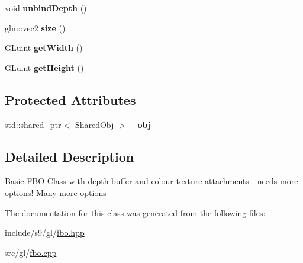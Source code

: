 \begin{DoxyCompactItemize}
\item 
\hypertarget{classs9_1_1gl_1_1FBO_af8f11487eabd27072d1a2189537deb96}{void {\bfseries unbind\-Depth} ()}\label{classs9_1_1gl_1_1FBO_af8f11487eabd27072d1a2189537deb96}

\item 
\hypertarget{classs9_1_1gl_1_1FBO_a7e167bec508bd08b77c0fd1086b887af}{glm\-::vec2 {\bfseries size} ()}\label{classs9_1_1gl_1_1FBO_a7e167bec508bd08b77c0fd1086b887af}

\item 
\hypertarget{classs9_1_1gl_1_1FBO_a871216289af220e56d59b49ac788b588}{G\-Luint {\bfseries get\-Width} ()}\label{classs9_1_1gl_1_1FBO_a871216289af220e56d59b49ac788b588}

\item 
\hypertarget{classs9_1_1gl_1_1FBO_aa17e9cf870cf5eb0b2fb780482d1c0da}{G\-Luint {\bfseries get\-Height} ()}\label{classs9_1_1gl_1_1FBO_aa17e9cf870cf5eb0b2fb780482d1c0da}

\end{DoxyCompactItemize}
\subsection*{Protected Attributes}
\begin{DoxyCompactItemize}
\item 
\hypertarget{classs9_1_1gl_1_1FBO_a467391f5bd87d1dfaa68aff17c9647c9}{std\-::shared\-\_\-ptr$<$ \hyperlink{structs9_1_1gl_1_1FBO_1_1SharedObj}{Shared\-Obj} $>$ {\bfseries \-\_\-obj}}\label{classs9_1_1gl_1_1FBO_a467391f5bd87d1dfaa68aff17c9647c9}

\end{DoxyCompactItemize}


\subsection{Detailed Description}
Basic \hyperlink{classs9_1_1gl_1_1FBO}{F\-B\-O} Class with depth buffer and colour texture attachments  -\/ needs more options! Many more options 

The documentation for this class was generated from the following files\-:\begin{DoxyCompactItemize}
\item 
include/s9/gl/\hyperlink{fbo_8hpp}{fbo.\-hpp}\item 
src/gl/\hyperlink{fbo_8cpp}{fbo.\-cpp}\end{DoxyCompactItemize}
